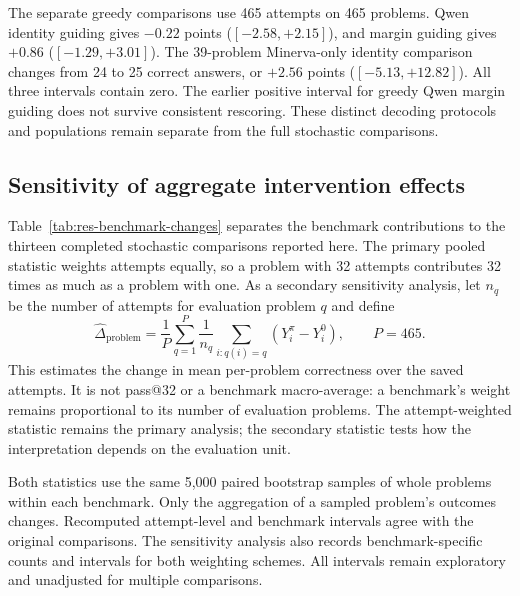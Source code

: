 \documentclass[12pt,a4paper,twoside,openright]{book}
\begin{document}
The separate greedy comparisons use 465 attempts on 465 problems.
Qwen identity guiding gives $-0.22$ points ($[-2.58,+2.15]$), and
margin guiding gives $+0.86$ ($[-1.29,+3.01]$). The 39-problem
Minerva-only identity comparison changes from 24 to 25 correct answers,
or $+2.56$ points ($[-5.13,+12.82]$). All three intervals contain zero.
The earlier positive interval for greedy Qwen margin guiding does not survive
consistent rescoring.
These distinct decoding protocols and populations remain separate from
the full stochastic comparisons.

\subsection{Sensitivity of aggregate intervention effects}
\label{sec:results-weighting}

Table~\ref{tab:res-benchmark-changes} separates the benchmark contributions
to the thirteen completed stochastic comparisons reported here. The primary pooled statistic
weights attempts equally, so a problem with 32 attempts contributes 32
times as much as a problem with one. As a secondary sensitivity analysis,
let $n_q$ be the number of attempts for evaluation problem $q$ and define
\begin{equation}
  \widehat\Delta_{\mathrm{problem}}
  =\frac{1}{P}\sum_{q=1}^{P}
    \frac{1}{n_q}\sum_{i:q(i)=q}(Y_i^{\pi}-Y_i^0),
  \qquad P=465.
  \label{eq:results-problem-weighted-effect}
\end{equation}
This estimates the change in mean per-problem correctness over the saved
attempts. It is not pass@32 or a benchmark macro-average: a benchmark's
weight remains proportional to its number of evaluation problems. The
attempt-weighted statistic remains the primary analysis; the secondary
statistic tests how the interpretation depends on the evaluation unit.

Both statistics use the same 5,000 paired bootstrap samples of whole
problems within each benchmark. Only the aggregation of a sampled
problem's outcomes changes. Recomputed attempt-level and benchmark
intervals agree with the original comparisons. The sensitivity analysis
also records benchmark-specific counts and intervals for both weighting
schemes.
All intervals remain exploratory and unadjusted for multiple comparisons.
\end{document}

